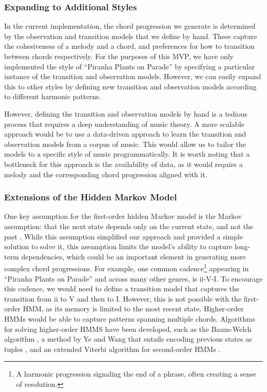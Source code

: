 \subsubsection{Expanding to Additional Styles}

In the current implementation, the chord progression we generate is determined by the observation and transition models that we define by hand. These capture the cohesiveness of a melody and a chord, and preferences for how to transition between chords respectively. For the purposes of this MVP, we have only implemented the style of ``Piranha Plants on Parade'' by specifying a particular instance of the transition and observation models. However, we can easily expand this to other styles by defining new transition and observation models according to different harmonic patterns.

However, defining the transition and observation models by hand is a tedious process that requires a deep understanding of music theory. A more scalable approach would be to use a data-driven approach to learn the transition and observation models from a corpus of music. This would allow us to tailor the models to a specific style of music programmatically. It is worth noting that a bottleneck for this approach is the availability of data, as it would require a melody and the corresponding chord progression aligned with it.

\subsubsection{Extensions of the Hidden Markov Model}

One key assumption for the first-order hidden Markov model is the Markov assumption: that the next state depends only on the current state, and not the past \autocite{SpeechLang:2025}. While this assumption simplified our approach and provided a simple solution to solve it, this assumption limits the model's ability to capture long-term dependencies, which could be an important element in generating more complex chord progressions. For example, one common cadence\footnote{A harmonic progression signaling the end of a phrase, often creating a sense of resolution.} appearing in ``Piranha Plants on Parade'' and across many other genres, is ii-V-I. To encourage this cadence, we would need to define a transition model that captures the transition from ii to V and then to I. However, this is not possible with the first-order HMM, as its memory is limited to the most recent state. Higher-order HMMs would be able to capture patterns spanning multiple chords. Algorithms for solving higher-order HMMS have been developed, such as the Baum-Welch algorithm \autocite{BaumWelch:1970}, a method by Ye and Wang that entails encoding previous states as tuples \autocite{DecodeHMM:2014}, and an extended Viterbi algorithm for second-order HMMs \autocite{Viterbi2:1988}.

